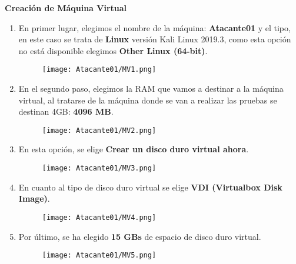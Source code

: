 \textbf{Creación de Máquina Virtual}
\begin{enumerate}

\item En primer lugar, elegimos el nombre de la máquina: \textbf{Atacante01} y el tipo, en este caso se trata de \textbf{Linux} versión Kali Linux 2019.3, como esta opción no está disponible elegimos \textbf{Other Linux (64-bit)}.
\begin{figure}[H] %
\begin{center}
\texttt{[image: Atacante01/MV1.png]}
\end{center}
\end{figure}

\item En el segundo paso, elegimos la RAM que vamos a destinar a la máquina virtual, al tratarse de la máquina donde se van a realizar las pruebas se destinan 4GB: \textbf{4096 MB}.
\begin{figure}[H] %
\begin{center}
\texttt{[image: Atacante01/MV2.png]}
\end{center}
\end{figure}

\item En esta opción, se elige \textbf{Crear un disco duro virtual ahora}.
\begin{figure}[H] %
\begin{center}
\texttt{[image: Atacante01/MV3.png]}
\end{center}
\end{figure}

\item En cuanto al tipo de disco duro virtual se elige \textbf{VDI (Virtualbox Disk Image)}.
\begin{figure}[H] %
\begin{center}
\texttt{[image: Atacante01/MV4.png]}
\end{center}
\end{figure}

\item Por último, se ha elegido \textbf{15 GBs} de espacio de disco duro virtual.
\begin{figure}[H] %
\begin{center}
\texttt{[image: Atacante01/MV5.png]}
\end{center}
\end{figure}


\end{enumerate}
